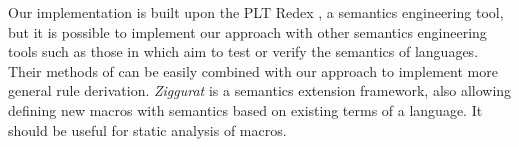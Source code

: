 Our implementation is built upon the PLT Redex \cite{SEwPR}, a semantics engineering tool, but it is possible to implement our approach with other semantics engineering tools such as those in \cite{dynsem,Ksemantic} which aim to test or verify the semantics of languages. Their methods of can be easily combined with our approach to implement more general rule derivation. \emph{Ziggurat} \cite{Ziggurat} is a semantics extension framework, also allowing defining new macros with semantics based on existing terms of a language. It should be useful for static analysis of macros.
